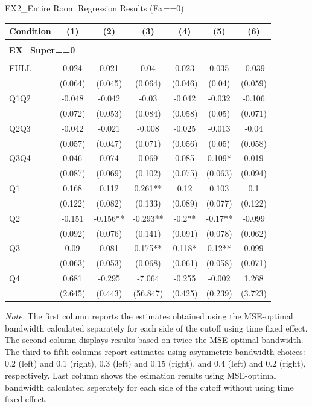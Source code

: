 \begin{table}[]
\TABLE
{EX2_Entire Room Regression Results (Ex==0) \label{ex2_result_detail2}}{\begin{tabular}{lcccccc}
\hline
Condition & (1) & (2) & (3) & (4) & (5) & (6) \\ \hline
\\ 
\multicolumn{5}{l}{\textbf{EX\_Super==0}} \\ 
\\ 
FULL & 0.024 & 0.021 & 0.04 & 0.023 & 0.035 & -0.039 \\ 
&(0.064)&(0.045) & (0.064)&(0.046)&(0.04)&(0.059)\\ 
Q1Q2 & -0.048 & -0.042 & -0.03 & -0.042 & -0.032 & -0.106 \\ 
&(0.072)&(0.053) & (0.084)&(0.058)&(0.05)&(0.071)\\ 
Q2Q3 & -0.042 & -0.021 & -0.008 & -0.025 & -0.013 & -0.04 \\ 
&(0.057)&(0.047) & (0.071)&(0.056)&(0.05)&(0.058)\\ 
Q3Q4 & 0.046 & 0.074 & 0.069 & 0.085 & 0.109* & 0.019 \\ 
&(0.087)&(0.069) & (0.102)&(0.075)&(0.063)&(0.094)\\ 
Q1 & 0.168 & 0.112 & 0.261** & 0.12 & 0.103 & 0.1 \\ 
&(0.122)&(0.082) & (0.133)&(0.089)&(0.077)&(0.122)\\ 
Q2 & -0.151 & -0.156** & -0.293** & -0.2** & -0.17** & -0.099 \\ 
&(0.092)&(0.076) & (0.141)&(0.091)&(0.078)&(0.062)\\ 
Q3 & 0.09 & 0.081 & 0.175** & 0.118* & 0.12** & 0.099 \\ 
&(0.063)&(0.053) & (0.068)&(0.061)&(0.058)&(0.071)\\ 
Q4 & 0.681 & -0.295 & -7.064 & -0.255 & -0.002 & 1.268 \\ 
&(2.645)&(0.443) & (56.847)&(0.425)&(0.239)&(3.723)\\ 
\hline 
 \end{tabular}}{\textit{Note.} The first column reports the estimates obtained using the MSE-optimal bandwidth calculated separately for each side of the cutoff using time fixed effect. The second column displays results based on twice the MSE-optimal bandwidth. The third to fifth columns report estimates using asymmetric bandwidth choices: 0.2 (left) and 0.1 (right), 0.3 (left) and 0.15 (right), and 0.4 (left) and 0.2 (right), respectively. Last column shows the esimation results using MSE-optimal bandwidth calculated seperately for each side of the cutoff without using time fixed effect.}
\end{table}
